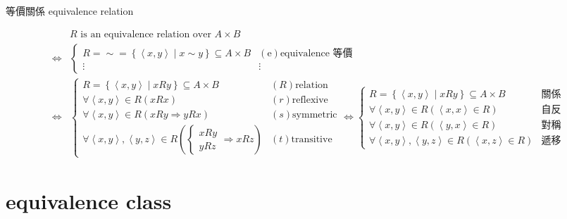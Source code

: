\documentclass[
]{book}
\theoremstyle{definition}
\theoremstyle{definition}
\theoremstyle{definition}
\theoremstyle{definition}
\theoremstyle{remark}
\begin{document}
\begin{CJK}{UTF8}{bsmi}等價關係 equivalence relation \label{def:equivalence-relation}
\end{CJK}
\begin{CJK}{UTF8}{bsmi}
\begin{align*}
 & R\text{ is an equivalence relation over }A\times B\\
\Leftrightarrow & \begin{cases}
R=\sim=\left\{ \left\langle x,y\right\rangle \middle|x\sim y\right\} \subseteq A\times B & \left(\text{e}\right)\text{equivalence 等價}\\
\vdots & \vdots
\end{cases}\\
\Leftrightarrow & \begin{cases}
R=\left\{ \left\langle x,y\right\rangle \middle|xRy\right\} \subseteq A\times B & \left(R\right)\text{relation}\\
\forall\left\langle x,y\right\rangle \in R\left(xRx\right) & \left(r\right)\text{reflexive}\\
\forall\left\langle x,y\right\rangle \in R\left(xRy\Rightarrow yRx\right) & \left(s\right)\text{symmetric}\\
\forall\left\langle x,y\right\rangle ,\left\langle y,z\right\rangle \in R\left(\begin{cases}
xRy\\
yRz
\end{cases}\Rightarrow xRz\right) & \left(t\right)\text{transitive}
\end{cases}\Leftrightarrow\begin{cases}
R=\left\{ \left\langle x,y\right\rangle \middle|xRy\right\} \subseteq A\times B & \text{關係}\\
\forall\left\langle x,y\right\rangle \in R\left(\left\langle x,x\right\rangle \in R\right) & \text{自反}\\
\forall\left\langle x,y\right\rangle \in R\left(\left\langle y,x\right\rangle \in R\right) & \text{對稱}\\
\forall\left\langle x,y\right\rangle ,\left\langle y,z\right\rangle \in R\left(\left\langle x,z\right\rangle \in R\right) & \text{遞移}
\end{cases}
\end{align*}
\end{CJK}

\hypertarget{equivalence-class}{%
\chapter*{equivalence class}\label{equivalence-class}}
\end{document}
